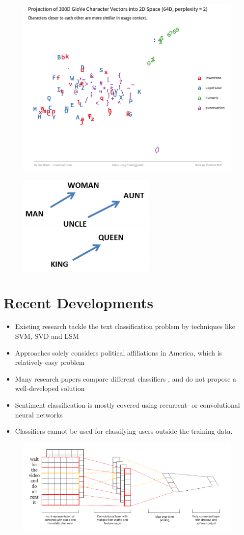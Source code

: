 \documentclass[final]{beamer}
\begin{document}
\begin{frame}[t]
\begin{multicols}{3}
\centering
\begin{figure}[h!]
  \includegraphics[width=0.70\linewidth]{char-tsne-2.png}
  \label{fig:glove}
\end{figure}


\centering
\begin{figure}[h!]
  \includegraphics[width=0.30\linewidth]{Vecs}
  \label{fig:glove}
\end{figure}


\section{Recent Developments}
\begin{itemize}
  \item Existing research \cite{ref2} tackle the text classification problem by techniques like SVM, SVD and LSM
  \item Approaches solely considers political affiliations in America, which is relatively easy problem
  \item Many research papers compare different classifiers \cite{ref1}, and do not propose a well-developed solution
  \item Sentiment classification is mostly covered using recurrent- or convolutional neural networks \cite{ref4}
  \item Classifiers cannot be used for classifying users outside the training data.\cite{ref3}
\end{itemize}
\centering
\centering
\begin{figure}[h!]
  \includegraphics[width=0.90\linewidth]{cnn.png}
  \label{fig:embedding}
\end{figure}



\end{multicols}
\end{frame}
\end{document}
